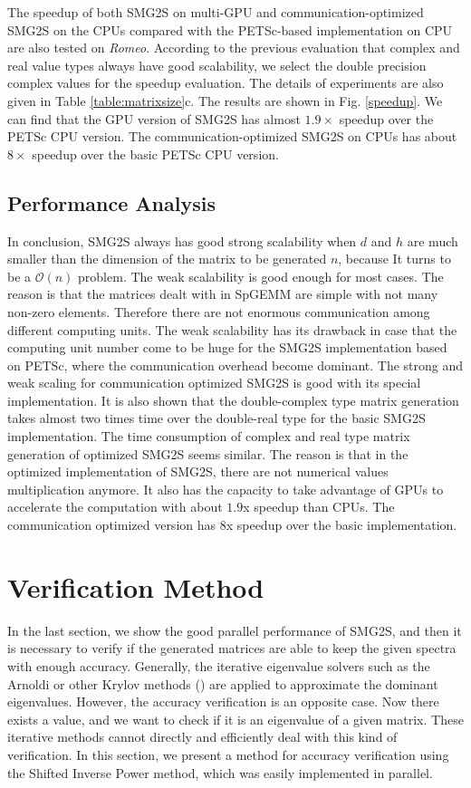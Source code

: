 The speedup of both SMG2S on multi-GPU and communication-optimized SMG2S on the CPUs compared with the PETSc-based implementation on CPU are also tested on \textit{Romeo}. According to the previous evaluation that complex and real value types always have good scalability, we select the double precision complex values for the speedup evaluation. The details of experiments are also given in Table \ref{table:matrixsize}c. The results are shown in Fig. \ref{speedup}. We can find that the GPU version of SMG2S has almost $1.9\times$ speedup over the PETSc CPU version. The communication-optimized SMG2S on CPUs has about $8\times$ speedup over the basic PETSc CPU version.

\subsection{Performance Analysis}

In conclusion, SMG2S always has good strong scalability when $d$ and $h$ are much smaller than the dimension of the matrix to be generated $n$, because It turns to be a $\mathcal{O}(n)$ problem. The weak scalability is good enough for most cases. The reason is that the matrices dealt with in SpGEMM are simple with not many non-zero elements. Therefore there are not enormous communication among different computing units. The weak scalability has its drawback in case that the computing unit number come to be huge for the SMG2S implementation based on PETSc, where the communication overhead become dominant. The strong and weak scaling for communication optimized SMG2S is good with its special implementation. It is also shown that the double-complex type matrix generation takes almost two times time over the double-real type for the basic SMG2S implementation. The time consumption of complex and real type matrix generation of optimized SMG2S seems similar. The reason is that in the optimized implementation of SMG2S, there are not numerical values multiplication anymore.  It also has the capacity to take advantage of GPUs to accelerate the computation with about $1.9$x speedup than CPUs. The communication optimized version has $8$x speedup over the basic implementation.

\section{Verification Method}

In the last section, we show the good parallel performance of SMG2S, and then it is necessary to verify if the generated matrices are able to keep the given spectra with enough accuracy. Generally, the iterative eigenvalue solvers such as the Arnoldi or other Krylov methods (\cite{petiton1992parallel}) are applied to approximate the dominant eigenvalues. However, the accuracy verification is an opposite case. Now there exists a value, and we want to check if it is an eigenvalue of a given matrix. These iterative methods cannot directly and efficiently deal with this kind of verification. In this section, we present a method for accuracy verification using the Shifted Inverse Power method, which was easily implemented in parallel.

